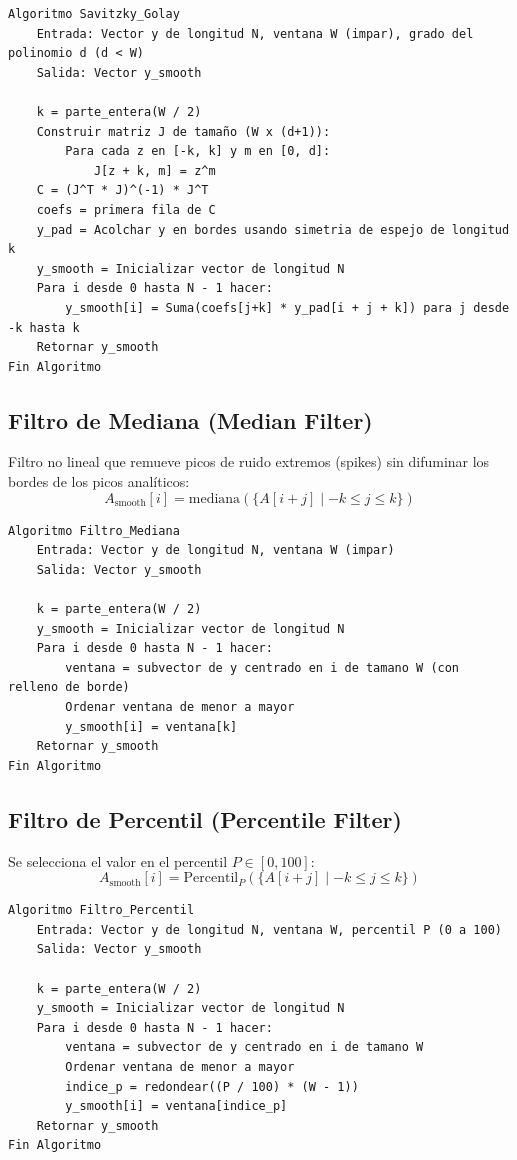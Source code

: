 \documentclass[a4paper,11pt]{article}
\begin{document}
\begin{lstlisting}[caption=Algoritmo de Savitzky-Golay]
Algoritmo Savitzky_Golay
    Entrada: Vector y de longitud N, ventana W (impar), grado del polinomio d (d < W)
    Salida: Vector y_smooth

    k = parte_entera(W / 2)
    Construir matriz J de tamaño (W x (d+1)):
        Para cada z en [-k, k] y m en [0, d]:
            J[z + k, m] = z^m
    C = (J^T * J)^(-1) * J^T
    coefs = primera fila de C
    y_pad = Acolchar y en bordes usando simetria de espejo de longitud k
    y_smooth = Inicializar vector de longitud N
    Para i desde 0 hasta N - 1 hacer:
        y_smooth[i] = Suma(coefs[j+k] * y_pad[i + j + k]) para j desde -k hasta k
    Retornar y_smooth
Fin Algoritmo
\end{lstlisting}

\subsection{Filtro de Mediana (Median Filter)}
Filtro no lineal que remueve picos de ruido extremos (spikes) sin difuminar los bordes de los picos analíticos:
\begin{equation}
    A_{\text{smooth}}[i] = \text{mediana} \left( \{A[i + j] \mid -k \le j \le k\} \right)
\end{equation}

\begin{lstlisting}[caption=Algoritmo de Filtro de Mediana]
Algoritmo Filtro_Mediana
    Entrada: Vector y de longitud N, ventana W (impar)
    Salida: Vector y_smooth

    k = parte_entera(W / 2)
    y_smooth = Inicializar vector de longitud N
    Para i desde 0 hasta N - 1 hacer:
        ventana = subvector de y centrado en i de tamano W (con relleno de borde)
        Ordenar ventana de menor a mayor
        y_smooth[i] = ventana[k]
    Retornar y_smooth
Fin Algoritmo
\end{lstlisting}

\subsection{Filtro de Percentil (Percentile Filter)}
Se selecciona el valor en el percentil $P \in [0, 100]$:
\begin{equation}
    A_{\text{smooth}}[i] = \text{Percentil}_P \left( \{A[i + j] \mid -k \le j \le k\} \right)
\end{equation}

\begin{lstlisting}[caption=Algoritmo de Filtro de Percentil]
Algoritmo Filtro_Percentil
    Entrada: Vector y de longitud N, ventana W, percentil P (0 a 100)
    Salida: Vector y_smooth

    k = parte_entera(W / 2)
    y_smooth = Inicializar vector de longitud N
    Para i desde 0 hasta N - 1 hacer:
        ventana = subvector de y centrado en i de tamano W
        Ordenar ventana de menor a mayor
        indice_p = redondear((P / 100) * (W - 1))
        y_smooth[i] = ventana[indice_p]
    Retornar y_smooth
Fin Algoritmo
\end{lstlisting}
\end{document}
